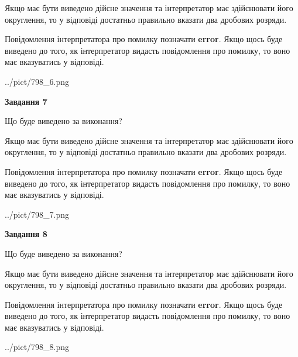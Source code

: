 \documentclass[12pt, ukrainian]{article}
\begin{document}
{\begin {Large}
Якщо має бути виведено дійсне значення та інтерпретатор має здійснювати його округлення, 
то у відповіді достатньо правильно вказати два дробових розряди.

Повідомлення інтерпретатора про помилку позначати \textbf{error}.
Якщо щось буде виведено до того, як інтерпретатор видасть повідомлення про помилку, 
то воно має вказуватись у відповіді. \par

\begin{center}
	{../pict/798_6.png}
\end{center}
\newpage

{\begin {center}\textbf{Завдання 7}\end {center}}\par
Що буде виведено за виконання? \par

Якщо має бути виведено дійсне значення та інтерпретатор має здійснювати його округлення, 
то у відповіді достатньо правильно вказати два дробових розряди.

Повідомлення інтерпретатора про помилку позначати \textbf{error}.
Якщо щось буде виведено до того, як інтерпретатор видасть повідомлення про помилку, 
то воно має вказуватись у відповіді. \par

\begin{center}
	{../pict/798_7.png}
\end{center}
\newpage

{\begin {center}\textbf{Завдання 8}\end {center}}\par
Що буде виведено за виконання? \par

Якщо має бути виведено дійсне значення та інтерпретатор має здійснювати його округлення, 
то у відповіді достатньо правильно вказати два дробових розряди.

Повідомлення інтерпретатора про помилку позначати \textbf{error}.
Якщо щось буде виведено до того, як інтерпретатор видасть повідомлення про помилку, 
то воно має вказуватись у відповіді. \par

\begin{center}
	{../pict/798_8.png}
\end{center}
\newpage


\end{Large}}
\end{document}

